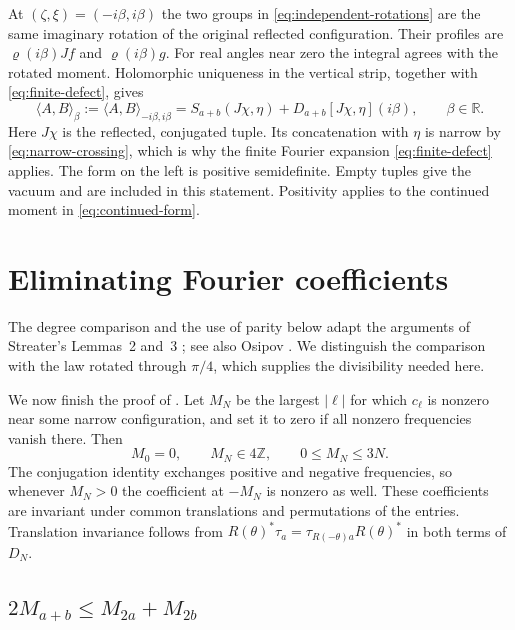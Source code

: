 \documentclass[11pt, letterpaper, reqno]{amsart}
\theoremstyle{definition}
\theoremstyle{remark}
\newcommand{\bbR}{\mathbb{R}}
\newcommand{\bbZ}{\mathbb{Z}}
\begin{document}
At $(\zeta,\xi)=(-i\beta,i\beta)$ the two groups in
\eqref{eq:independent-rotations} are the same imaginary rotation of
the original reflected configuration. Their profiles are
$\varrho(i\beta)Jf$ and $\varrho(i\beta)g$. For real angles near zero
the integral agrees with the rotated moment. Holomorphic uniqueness
in the vertical strip, together with \eqref{eq:finite-defect}, gives
\begin{equation}\label{eq:continued-form}
 \langle A,B\rangle_\beta
 :=\langle A,B\rangle_{-i\beta,i\beta}
 =S_{a+b}(J\chi,\eta)+D_{a+b}[J\chi,\eta](i\beta),
 \qquad\beta\in\bbR.
\end{equation}
Here $J\chi$ is the reflected, conjugated tuple. Its concatenation
with $\eta$ is narrow by \eqref{eq:narrow-crossing}, which is why
the finite Fourier expansion \eqref{eq:finite-defect} applies.
The form on the left is positive semidefinite. Empty tuples give
the vacuum and are included in this statement. Positivity applies
to the continued moment in \eqref{eq:continued-form}.

\section{Eliminating Fourier coefficients}\label{sec:eliminating}

The degree comparison and the use of parity below adapt the arguments
of Streater's Lemmas~2 and~3 \cite[pp.~113--114]{Streater}; see also
Osipov \cite[p.~115]{O}. We distinguish the comparison with the law
rotated through $\pi/4$, which supplies the divisibility needed here.

We now finish the proof of . Let $M_N$ be the largest
$|\ell|$ for which $c_\ell$ is nonzero near some narrow configuration,
and set it to zero if all nonzero frequencies vanish there. Then
\begin{equation}\label{eq:M-bound}
 M_0=0,\qquad M_N\in4\bbZ,\qquad0\leq M_N\leq3N.
\end{equation}
The conjugation identity exchanges positive and negative frequencies,
so whenever $M_N>0$ the coefficient at $-M_N$ is nonzero as well.
These coefficients are invariant under common translations and
permutations of the entries. Translation invariance follows from
$R(\theta)^*\tau_a=\tau_{R(-\theta)a}R(\theta)^*$ in both terms
of $D_N$.

\subsection{$2M_{a+b}\leq M_{2a}+M_{2b}$}
\end{document}
